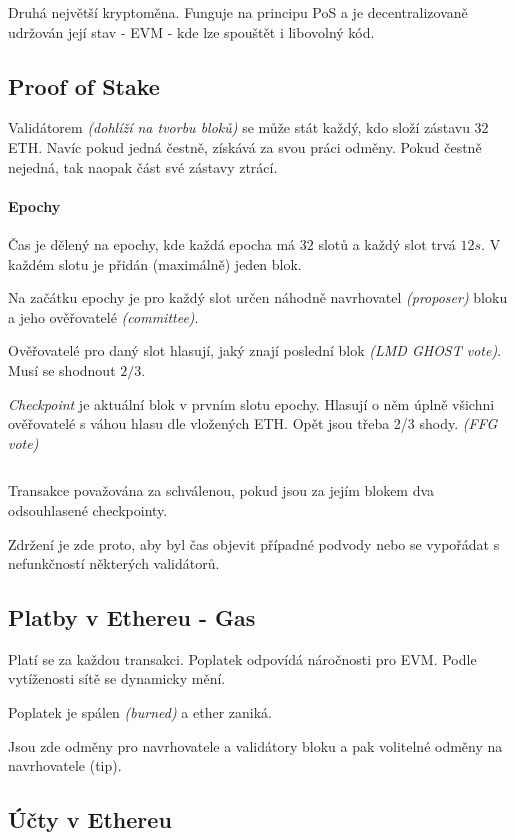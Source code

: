 \documentclass[10pt,a4paper]{article}
\begin{document}
Druhá největší kryptoměna. Funguje na principu PoS a je decentralizovaně udržován její stav - EVM - kde lze spouštět i libovolný kód.

\subsection{Proof of Stake}

Validátorem \textit{(dohlíží na tvorbu bloků)} se může stát každý, kdo složí zástavu $ 32 $ ETH.
Navíc pokud jedná čestně, získává za svou práci odměny. Pokud čestně nejedná, tak naopak část své zástavy ztrácí.

\paragraph{Epochy}
Čas je dělený na epochy, kde každá epocha má $ 32 $ slotů a každý slot trvá $ 12s $.
V každém slotu je přidán (maximálně) jeden blok.

Na začátku epochy je pro každý slot určen náhodně navrhovatel \textit{(proposer)} bloku a jeho ověřovatelé \textit{(committee)}.


Ověřovatelé pro daný slot hlasují, jaký znají poslední blok \textit{(LMD GHOST vote)}. Musí se shodnout $ 2/3 $.

\textit{Checkpoint} je aktuální blok v prvním slotu epochy. Hlasují o něm úplně všichni ověřovatelé s váhou hlasu dle vložených ETH. Opět jsou třeba 2/3 shody. \textit{(FFG vote)}

$ $

Transakce považována za schválenou, pokud jsou za jejím blokem dva odsouhlasené checkpointy.

Zdržení je zde proto, aby byl čas objevit případné podvody nebo se vypořádat s nefunkčností některých validátorů.

\subsection{Platby v Ethereu - Gas}

Platí se za každou transakci. Poplatek odpovídá náročnosti pro EVM. Podle vytíženosti sítě se dynamicky mění.

Poplatek je spálen \textit{(burned)} a ether zaniká.

Jsou zde odměny pro navrhovatele a validátory bloku a pak volitelné odměny na navrhovatele (tip).

\subsection{Účty v Ethereu}
\end{document}
